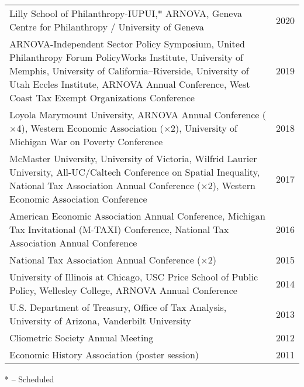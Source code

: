 \documentclass[12pt]{article}
\newlength{\dategap}
\newcommand{\X}{$\times$}		%
\begin{document}
\begin{tabular}[t]{H{0.75\textwidth} R{0.187\textwidth}}

Lilly School of Philanthropy-IUPUI,*
ARNOVA,
Geneva Centre for Philanthropy / University of Geneva										
																& 2020 \\ \addlinespace[\dategap]

ARNOVA-Independent Sector Policy Symposium,
United Philanthropy Forum PolicyWorks Institute,
University of Memphis, 
University of California--Riverside,
University of Utah Eccles Institute, ARNOVA Annual Conference, 
West Coast Tax Exempt Organizations Conference
																& 2019 \\ \addlinespace[\dategap]

Loyola Marymount University,
ARNOVA Annual Conference (\X4), 
Western Economic Association (\X2),
University of Michigan War on Poverty Conference 
																& 2018 \\ \addlinespace[\dategap]
McMaster University, 
University of Victoria, 
Wilfrid Laurier University,	
All-UC/Caltech Conference on Spatial Inequality,
National Tax Association Annual Conference (\X2), 
Western Economic Association Conference
																& 2017 \\ \addlinespace[\dategap]
American Economic Association Annual Conference,
	Michigan Tax Invitational (M-TAXI) Conference,
	National Tax Association Annual Conference 
																& 2016 \\ \addlinespace[\dategap]
																						
National Tax Association Annual Conference (\X2)					& 2015 \\ \addlinespace[\dategap]																					

University of Illinois at Chicago,
USC Price School of Public Policy, 
Wellesley College, 
ARNOVA Annual Conference 						
																& 2014 \\ \addlinespace[\dategap]	
																					
U.S. Department of Treasury, Office of Tax Analysis, 
University of Arizona,
Vanderbilt University 												
																& 2013 \\ \addlinespace[\dategap]																												
Cliometric Society Annual Meeting								& 2012 \\ \addlinespace[\dategap]									
Economic History Association (poster session)					& 2011
\end{tabular}

* -- Scheduled
\end{document}

